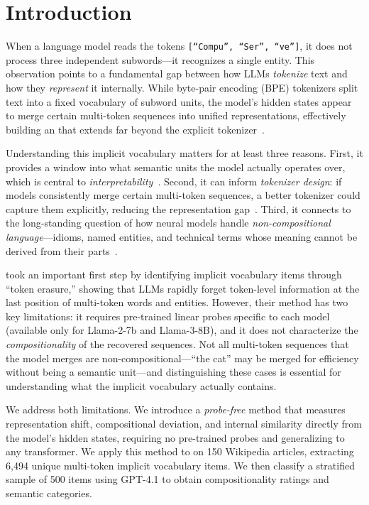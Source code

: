 \section{Introduction}
\label{sec:intro}

When a language model reads the tokens \texttt{[``Compu'', ``Ser'', ``ve'']}, it does not process three independent subwords---it recognizes a single entity.
This observation points to a fundamental gap between how LLMs \emph{tokenize} text and how they \emph{represent} it internally.
While byte-pair encoding (BPE) tokenizers split text into a fixed vocabulary of subword units, the model's hidden states appear to merge certain multi-token sequences into unified representations, effectively building an  that extends far beyond the explicit tokenizer~\cite{feucht2024token}.

Understanding this implicit vocabulary matters for at least three reasons.
First, it provides a window into what semantic units the model actually operates over, which is central to \emph{interpretability}~\cite{geva2020transformer}.
Second, it can inform \emph{tokenizer design}: if models consistently merge certain multi-token sequences, a better tokenizer could capture them explicitly, reducing the representation gap~\cite{yang2024rethinking}.
Third, it connects to the long-standing question of how neural models handle \emph{non-compositional language}---idioms, named entities, and technical terms whose meaning cannot be derived from their parts~\cite{garcia2021probing}.

\citet{feucht2024token} took an important first step by identifying implicit vocabulary items through ``token erasure,'' showing that LLMs rapidly forget token-level information at the last position of multi-token words and entities.
However, their method has two key limitations: it requires pre-trained linear probes specific to each model (available only for Llama-2-7b and Llama-3-8B), and it does not characterize the \emph{compositionality} of the recovered sequences.
Not all multi-token sequences that the model merges are non-compositional---``the cat'' may be merged for efficiency without being a semantic unit---and distinguishing these cases is essential for understanding what the implicit vocabulary actually contains.

We address both limitations.
We introduce a \emph{probe-free} method that measures representation shift, compositional deviation, and internal similarity directly from the model's hidden states, requiring no pre-trained probes and generalizing to any transformer.
We apply this method to \mistral on 150 Wikipedia articles, extracting 6{,}494 unique multi-token implicit vocabulary items.
We then classify a stratified sample of 500 items using GPT-4.1 to obtain compositionality ratings and semantic categories.

